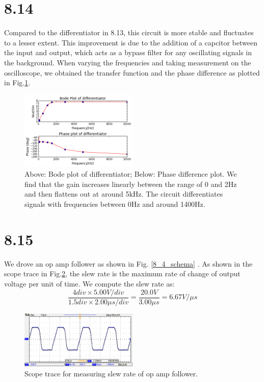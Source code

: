 \documentclass[authoryear, 12pt,5p, times]{elsarticle}
\begin{document}
  \section*{8.14}
Compared to the differentiator in 8.13, this circuit is more stable and fluctuates to a lesser extent. This improvement is due to the addition of a capcitor between the input and output, which acts as a bypass filter for any oscillating signals in the background. When varying the frequencies and taking measurement on the oscilloscope, we obtained the transfer function and the phase difference as plotted in Fig.\ref{8_14_plot}.
 \begin{figure}[h!]
 \centering
  \includegraphics[width=0.5\textwidth]{figure/8_14_plot.png} 
\caption{Above: Bode plot of differentiator; Below: Phase difference plot. We find that the gain increases linearly between the range of 0 and 2Hz and then flattens out at around 5kHz. The circuit differentiates signals with frequencies between 0Hz and around 1400Hz.}
\label{8_14_plot}
 \end{figure}
 \section*{8.15}
We drove an op amp follower as shown in Fig. \ref{8_4_schema} . As shown in the scope trace in Fig.\ref{scope}, the slew rate is the maximum rate of change of output voltage per unit of time. We compute the slew rate as: 
\begin{equation}
 \frac{4 div \times 5.00V/div}{1.5 div \times 2.00 \mu s /div}
 = \frac{20.0V}{3.00\mu s} = 6.67 V/\mu s
\end{equation} 
 \begin{figure}[h!]
 \centering
  \includegraphics[width=0.5\textwidth]{figure/TEK00000.png} 
\caption{Scope trace for measuring slew rate of op amp follower.}
\label{scope}
 \end{figure}
\end{document}

